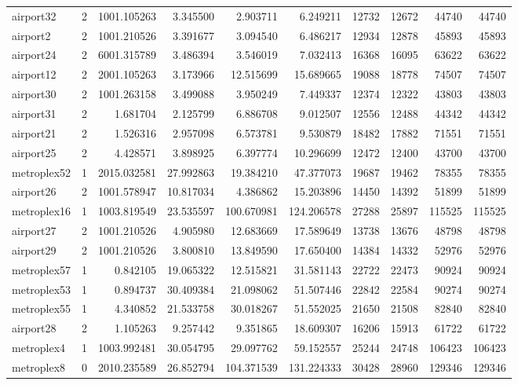 \begin{longtable}{|l|r|r|r|r|r|r|r|r|r|}
airport32 & 2 & 1001.105263 & 3.345500 & 2.903711 & 6.249211 & 12732 & 12672 & 44740 & 44740 \\
airport2 & 2 & 1001.210526 & 3.391677 & 3.094540 & 6.486217 & 12934 & 12878 & 45893 & 45893 \\
airport24 & 2 & 6001.315789 & 3.486394 & 3.546019 & 7.032413 & 16368 & 16095 & 63622 & 63622 \\
airport12 & 2 & 2001.105263 & 3.173966 & 12.515699 & 15.689665 & 19088 & 18778 & 74507 & 74507 \\
airport30 & 2 & 1001.263158 & 3.499088 & 3.950249 & 7.449337 & 12374 & 12322 & 43803 & 43803 \\
airport31 & 2 & 1.681704 & 2.125799 & 6.886708 & 9.012507 & 12556 & 12488 & 44342 & 44342 \\
airport21 & 2 & 1.526316 & 2.957098 & 6.573781 & 9.530879 & 18482 & 17882 & 71551 & 71551 \\
airport25 & 2 & 4.428571 & 3.898925 & 6.397774 & 10.296699 & 12472 & 12400 & 43700 & 43700 \\
metroplex52 & 1 & 2015.032581 & 27.992863 & 19.384210 & 47.377073 & 19687 & 19462 & 78355 & 78355 \\
airport26 & 2 & 1001.578947 & 10.817034 & 4.386862 & 15.203896 & 14450 & 14392 & 51899 & 51899 \\
metroplex16 & 1 & 1003.819549 & 23.535597 & 100.670981 & 124.206578 & 27288 & 25897 & 115525 & 115525 \\
airport27 & 2 & 1001.210526 & 4.905980 & 12.683669 & 17.589649 & 13738 & 13676 & 48798 & 48798 \\
airport29 & 2 & 1001.210526 & 3.800810 & 13.849590 & 17.650400 & 14384 & 14332 & 52976 & 52976 \\
metroplex57 & 1 & 0.842105 & 19.065322 & 12.515821 & 31.581143 & 22722 & 22473 & 90924 & 90924 \\
metroplex53 & 1 & 0.894737 & 30.409384 & 21.098062 & 51.507446 & 22842 & 22584 & 90274 & 90274 \\
metroplex55 & 1 & 4.340852 & 21.533758 & 30.018267 & 51.552025 & 21650 & 21508 & 82840 & 82840 \\
airport28 & 2 & 1.105263 & 9.257442 & 9.351865 & 18.609307 & 16206 & 15913 & 61722 & 61722 \\
metroplex4 & 1 & 1003.992481 & 30.054795 & 29.097762 & 59.152557 & 25244 & 24748 & 106423 & 106423 \\
metroplex8 & 0 & 2010.235589 & 26.852794 & 104.371539 & 131.224333 & 30428 & 28960 & 129346 & 129346 \\

\end{longtable}
